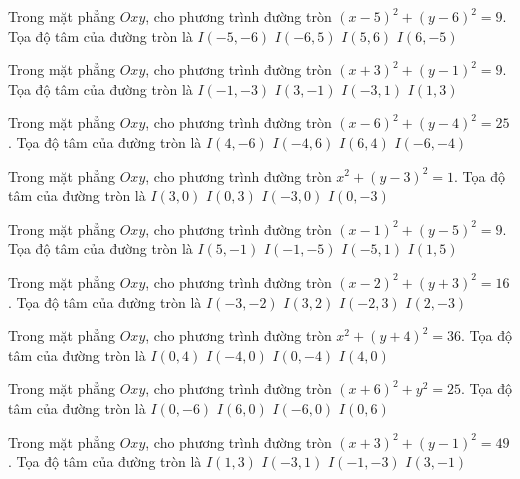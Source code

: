 \begin{ex}
Trong mặt phẳng $Oxy$, cho phương trình đường tròn $(x -5)^2   + (y -6)^2 = 9$. Tọa độ tâm của đường tròn là
\choice
{ $I(-5, -6)$ }
{ $I(-6, 5)$ }
{ \True $I(5, 6)$ }
{ $I(6, -5)$ }
\end{ex}

\begin{ex}
Trong mặt phẳng $Oxy$, cho phương trình đường tròn $(x + 3)^2  + (y -1)^2 = 9$. Tọa độ tâm của đường tròn là
\choice
{ $I(-1, -3)$ }
{ $I(3, -1)$ }
{ \True $I(-3, 1)$ }
{ $I(1, 3)$ }
\end{ex}

\begin{ex}
Trong mặt phẳng $Oxy$, cho phương trình đường tròn $(x -6)^2   + (y -4)^2 = 25$. Tọa độ tâm của đường tròn là
\choice
{ $I(4, -6)$ }
{ $I(-4, 6)$ }
{ \True $I(6, 4)$ }
{ $I(-6, -4)$ }
\end{ex}

\begin{ex}
Trong mặt phẳng $Oxy$, cho phương trình đường tròn $x^2 + (y -3)^2 = 1$. Tọa độ tâm của đường tròn là
\choice
{ $I(3, 0)$ }
{ \True $I(0, 3)$ }
{ $I(-3, 0)$ }
{ $I(0, -3)$ }
\end{ex}

\begin{ex}
Trong mặt phẳng $Oxy$, cho phương trình đường tròn $(x -1)^2   + (y -5)^2 = 9$. Tọa độ tâm của đường tròn là
\choice
{ $I(5, -1)$ }
{ $I(-1, -5)$ }
{ $I(-5, 1)$ }
{ \True $I(1, 5)$ }
\end{ex}

\begin{ex}
Trong mặt phẳng $Oxy$, cho phương trình đường tròn $(x -2)^2   + (y + 3)^2 = 16$. Tọa độ tâm của đường tròn là
\choice
{ $I(-3, -2)$ }
{ $I(3, 2)$ }
{ $I(-2, 3)$ }
{ \True $I(2, -3)$ }
\end{ex}

\begin{ex}
Trong mặt phẳng $Oxy$, cho phương trình đường tròn $x^2 + (y + 4)^2 = 36$. Tọa độ tâm của đường tròn là
\choice
{ $I(0, 4)$ }
{ $I(-4, 0)$ }
{ \True $I(0, -4)$ }
{ $I(4, 0)$ }
\end{ex}

\begin{ex}
Trong mặt phẳng $Oxy$, cho phương trình đường tròn $(x + 6)^2  + y^2 = 25$. Tọa độ tâm của đường tròn là
\choice
{ $I(0, -6)$ }
{ $I(6, 0)$ }
{ \True $I(-6, 0)$ }
{ $I(0, 6)$ }
\end{ex}

\begin{ex}
Trong mặt phẳng $Oxy$, cho phương trình đường tròn $(x + 3)^2  + (y -1)^2 = 49$. Tọa độ tâm của đường tròn là
\choice
{ $I(1, 3)$ }
{ \True $I(-3, 1)$ }
{ $I(-1, -3)$ }
{ $I(3, -1)$ }
\end{ex}

